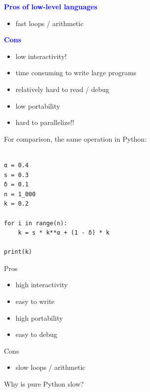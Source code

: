 \documentclass[
    xcolor={svgnames,dvipsnames},
    hyperref={colorlinks, citecolor=DeepPink4, linkcolor=DarkRed, urlcolor=DarkBlue}
    ]{beamer}  %
\newcommand{\navy}[1]{\textcolor{Blue}{\bf #1}}
\newcommand{\1}{\mathbbm 1}
\begin{document}
\begin{frame}

    \navy{Pros of low-level languages}

    \begin{itemize}
        \item fast loops / arithmetic
    \end{itemize}


    \vspace{0.5em}

    \navy{Cons}

    \begin{itemize}
        \item low interactivity!
        \item time consuming to write large programs
        \item relatively hard to read / debug
        \item low portability
        \item hard to parallelize!!
    \end{itemize}

\end{frame}




\begin{frame}[fragile]

    For comparison, the same operation in Python:
    
    \begin{verbatim}

α = 0.4
s = 0.3
δ = 0.1
n = 1_000
k = 0.2

for i in range(n):
    k = s * k**α + (1 - δ) * k

print(k)

    \end{verbatim}

\end{frame}



\begin{frame}

    Pros

    \begin{itemize}
        \item high interactivity
        \item easy to write
        \item high portability
        \item easy to debug
    \end{itemize}

    \vspace{0.5em}

    Cons

    \begin{itemize}
        \item slow loops / arithmetic
    \end{itemize}

    \pause
    \vspace{0.5em}
    \vspace{0.5em}
    Why is pure Python slow?


\end{frame}
\end{document}
